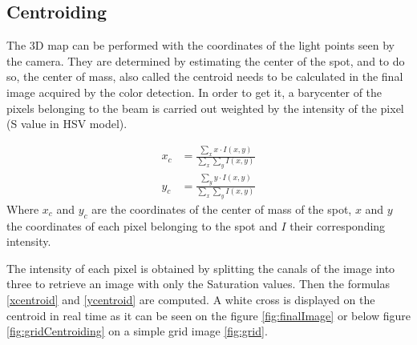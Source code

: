 \subsection{Centroiding}

The 3D map can be performed with the coordinates of the light points seen by the camera. They are determined by estimating the center of the spot, and to do so, the center of mass, also called the centroid needs to be calculated in the final image acquired by the color detection. In order to get it, a barycenter of the pixels belonging to the beam is carried out weighted by the intensity of the pixel (S value in HSV model).

\begin{align}
x_c &= \frac{\sum_x x \cdot I(x,y)}{\sum_x \sum_y I(x,y)} \label{xcentroid} \\
y_c &= \frac{\sum_y y \cdot I(x,y)}{\sum_x \sum_y I(x,y)} \label{ycentroid}
\end{align}
Where $x_c$ and $y_c$ are the coordinates of the center of mass of the spot, $x$ and $y$ the coordinates of each pixel belonging to the spot and $I$ their corresponding intensity.

The intensity of each pixel is obtained by splitting the canals of the image into three to retrieve an image with only the Saturation values. Then the formulas \eqref{xcentroid} and \eqref{ycentroid} are computed. A white cross is displayed on the centroid in real time as it can be seen on the figure \ref{fig:finalImage} or below figure \ref{fig:gridCentroiding} on a simple grid image \ref{fig:grid}.

